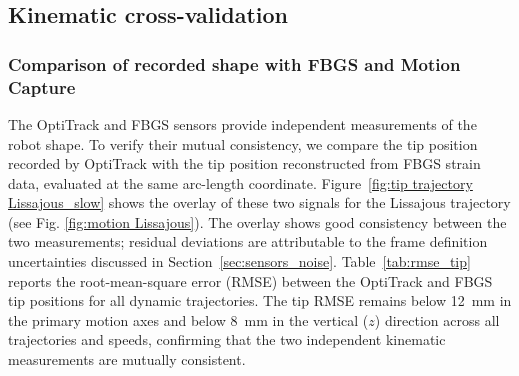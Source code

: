 \documentclass[14pt, a4paper]{article}
\begin{document}
\subsection{Kinematic cross-validation}
\label{sec:kin_cross_val}

\subsubsection{Comparison of recorded shape with FBGS and Motion Capture}

The OptiTrack and FBGS sensors provide independent measurements of the robot shape.
To verify their mutual consistency, we compare the tip position recorded by OptiTrack with the tip position reconstructed from FBGS strain data, evaluated at the same arc-length coordinate.
Figure~\ref{fig:tip trajectory Lissajous_slow} shows the overlay of these two signals for the Lissajous trajectory (see Fig. \ref{fig:motion Lissajous}).
The overlay shows good consistency between the two measurements; residual deviations are attributable to the frame definition uncertainties discussed in Section~\ref{sec:sensors_noise}.
Table~\ref{tab:rmse_tip} reports the root-mean-square error (RMSE) between the OptiTrack and FBGS tip positions for all dynamic trajectories.
The tip RMSE remains below \SI{12}{\milli\meter} in the primary motion axes and below \SI{8}{\milli\meter} in the vertical ($z$) direction across all trajectories and speeds, confirming that the two independent kinematic measurements are mutually consistent.
\end{document}
